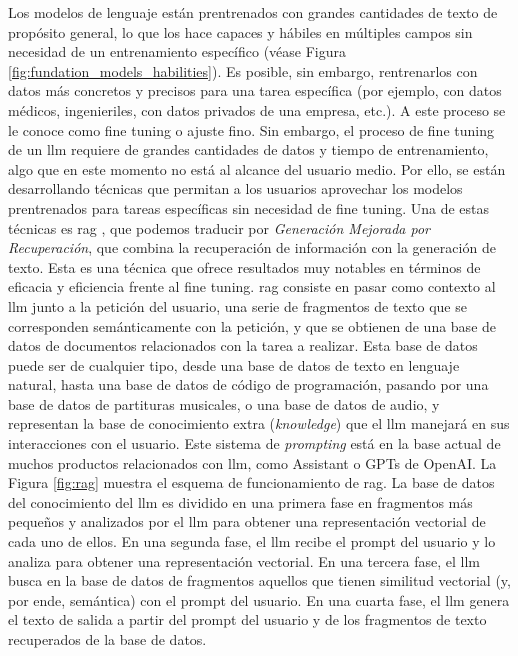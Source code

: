 Los modelos de lenguaje están prentrenados con grandes cantidades de texto de propósito general, lo que los hace capaces y hábiles en múltiples campos sin necesidad de un entrenamiento específico (véase Figura \ref{fig:fundation_models_habilities}). Es posible, sin embargo, rentrenarlos con datos más concretos y precisos para una tarea específica (por ejemplo, con datos médicos, ingenieriles, con datos privados de una empresa, etc.). A este proceso se le conoce como {fine tuning} o ajuste fino. Sin embargo, el proceso de {fine tuning} de un \gls{llm} requiere de grandes cantidades de datos y tiempo de entrenamiento, algo que en este momento no está al alcance del usuario medio. Por ello, se están desarrollando técnicas que permitan a los usuarios aprovechar los modelos prentrenados para tareas específicas sin necesidad de {fine tuning}. Una de estas técnicas es \gls{rag} \citep{WhatRetrievalaugmentedGeneration2021}, que podemos traducir por \emph{Generación Mejorada por Recuperación}, que combina la recuperación de información con la generación de texto. Esta es una técnica que ofrece resultados muy notables en términos de eficacia y eficiencia frente al {fine tuning}. \gls{rag} consiste en pasar como contexto al \gls{llm} junto a la petición del usuario, una serie de fragmentos de texto que se corresponden semánticamente con la petición, y que se obtienen de una base de datos de documentos relacionados con la tarea a realizar. Esta base de datos puede ser de cualquier tipo, desde una base de datos de texto en lenguaje natural, hasta una base de datos de código de programación, pasando por una base de datos de partituras musicales, o una base de datos de audio, y representan la base de conocimiento extra (\emph{knowledge}) que el \gls{llm} manejará en sus interacciones con el usuario. Este sistema de \emph{prompting} está en la base actual de muchos productos relacionados con \gls{llm}, como Assistant o GPTs de OpenAI. La Figura \ref{fig:rag} muestra el esquema de funcionamiento de \gls{rag}. La base de datos del conocimiento del \gls{llm} es dividido en una primera fase en fragmentos más pequeños y analizados por el \gls{llm} para obtener una representación vectorial de cada uno de ellos. En una segunda fase, el \gls{llm} recibe el {prompt} del usuario y lo analiza para obtener una representación vectorial. En una tercera fase, el \gls{llm} busca en la base de datos de fragmentos aquellos que tienen similitud vectorial (y, por ende, semántica) con el {prompt} del usuario. En una cuarta fase, el \gls{llm} genera el texto de salida a partir del {prompt} del usuario y de los fragmentos de texto recuperados de la base de datos. 


